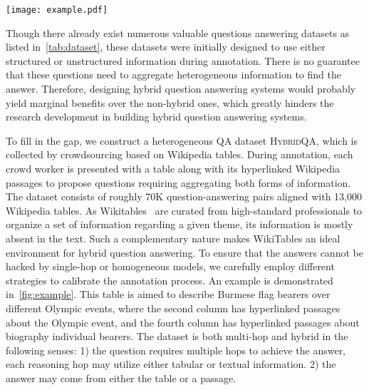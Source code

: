 \documentclass[11pt,a4paper]{article}
\newcommand{\dataset}{\textsc{HybridQA}\xspace}
\begin{document}
\begin{figure*}[!t]
    \centering
    \texttt{[image: example.pdf]}
    \caption{Examples of annotated question answering pairs from Wikipedia page\footnote{\url{https://en.wikipedia.org/wiki/List_of_flag_bearers_for_Myanmar_at_the_Olympics}}. Underlined entities have hyperlinked passages, which are displayed in the boxes. The lower part shows the human-annotated question-answer pairs roughly categorized based on their hardness.}
    \label{fig:example}
    \vspace{-2ex}
\end{figure*}
Though there already exist numerous valuable questions answering datasets as listed in~\autoref{tab:dataset}, these datasets were initially designed to use either structured or unstructured information during annotation. There is no guarantee that these questions need to aggregate heterogeneous information to find the answer. Therefore, designing hybrid question answering systems would probably yield marginal benefits over the non-hybrid ones, which greatly hinders the research development in building hybrid question answering systems.

To fill in the gap, we construct a heterogeneous QA dataset \dataset, which is collected by crowdsourcing based on Wikipedia tables. During annotation, each crowd worker is presented with a table along with its hyperlinked Wikipedia passages to propose questions requiring aggregating both forms of information. The dataset consists of roughly 70K question-answering pairs aligned with 13,000 Wikipedia tables. As Wikitables~\cite{bhagavatula2013methods} are curated from high-standard professionals to organize a set of information regarding a given theme, its information is mostly absent in the text. Such a complementary nature makes WikiTables an ideal environment for hybrid question answering. To ensure that the answers cannot be hacked by single-hop or homogeneous models, we carefully employ different strategies to calibrate the annotation process. An example is demonstrated in~\autoref{fig:example}. This table is aimed to describe Burmese flag bearers over different Olympic events, where the second column has hyperlinked passages about the Olympic event, and the fourth column has hyperlinked passages about biography individual bearers. The dataset is both multi-hop and hybrid in the following senses: 1) the question requires multiple hops to achieve the answer, each reasoning hop may utilize either tabular or textual information. 2) the answer may come from either the table or a passage. 
\end{document}
